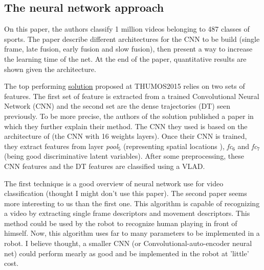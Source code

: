 \documentclass[a4paper]{article}
\begin{document}
		\subsection{The neural network approach}
			On this paper\cite{karpathy2014large}, the authors classify 1 million videos belonging to 487 classes of sports. The paper describe different architectures for the CNN to be build (single frame, late fusion, early fusion and slow fusion), then present a way to increase the learning time of the net. At the end of the paper, quantitative results are shown given the architecture.

			The top performing \href{http://storage.googleapis.com/www.thumos.info/thumos15_notebooks/TH15_UTS&CMU.pdf}{solution} proposed at THUMOS2015\cite{THUMOS15} relies on two sets of features. The first set of feature is extracted from a trained Convolutional Neural Network (CNN) and the second set are the dense trajectories (DT) seen previously. To be more precise, the authors of the solution published a paper\cite{xu2014discriminative} in which they further explain their method. The CNN they used is based on the architecture of \cite{simonyan2014very} (the CNN with 16 weights layers). Once their CNN is trained, they extract features from layer \textit{pool$_5$} (representing spatial locations ), \textit{fc$_6$} and \textit{fc$_7$} (being good discriminative latent variables). After some preprocessing, these CNN features and the DT features are classified using a VLAD.

			\begin{mdframed}[backgroundcolor = gray!30]
				The first technique is a good overview of neural network use for video classification (thought I might don't use this paper).
				The second paper seems more interesting to us than the first one. This algorithm is capable of recognizing a video by extracting single frame descriptors and movement descriptors. This method could be used by the robot to recognize human playing in front of himself. Now, this algorithm uses far to many parameters to be implemented in a robot. I believe thought, a smaller CNN (or Convolutional-auto-encoder neural net) could perform mearly as good and be implemented in the robot at 'little' cost.
			\end{mdframed}
\end{document}
